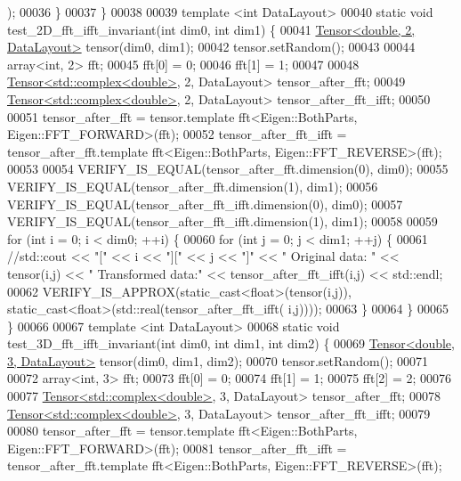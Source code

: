 \begin{DoxyCode}
      );
00036   \}
00037 \}
00038 
00039 \textcolor{keyword}{template} <\textcolor{keywordtype}{int} DataLayout>
00040 \textcolor{keyword}{static} \textcolor{keywordtype}{void} test\_2D\_fft\_ifft\_invariant(\textcolor{keywordtype}{int} dim0, \textcolor{keywordtype}{int} dim1) \{
00041   \hyperlink{class_eigen_1_1_tensor}{Tensor<double, 2, DataLayout>} tensor(dim0, dim1);
00042   tensor.setRandom();
00043 
00044   array<int, 2> fft;
00045   fft[0] = 0;
00046   fft[1] = 1;
00047 
00048   \hyperlink{class_eigen_1_1_tensor}{Tensor<std::complex<double>}, 2, DataLayout> tensor\_after\_fft;
00049   \hyperlink{class_eigen_1_1_tensor}{Tensor<std::complex<double>}, 2, DataLayout> tensor\_after\_fft\_ifft;
00050 
00051   tensor\_after\_fft = tensor.template fft<Eigen::BothParts, Eigen::FFT\_FORWARD>(fft);
00052   tensor\_after\_fft\_ifft = tensor\_after\_fft.template fft<Eigen::BothParts, Eigen::FFT\_REVERSE>(fft);
00053 
00054   VERIFY\_IS\_EQUAL(tensor\_after\_fft.dimension(0), dim0);
00055   VERIFY\_IS\_EQUAL(tensor\_after\_fft.dimension(1), dim1);
00056   VERIFY\_IS\_EQUAL(tensor\_after\_fft\_ifft.dimension(0), dim0);
00057   VERIFY\_IS\_EQUAL(tensor\_after\_fft\_ifft.dimension(1), dim1);
00058 
00059   \textcolor{keywordflow}{for} (\textcolor{keywordtype}{int} i = 0; i < dim0; ++i) \{
00060     \textcolor{keywordflow}{for} (\textcolor{keywordtype}{int} j = 0; j < dim1; ++j) \{
00061       \textcolor{comment}{//std::cout << "[" << i << "][" << j << "]" <<  "  Original data: " << tensor(i,j) << " Transformed
       data:" << tensor\_after\_fft\_ifft(i,j) << std::endl;}
00062       VERIFY\_IS\_APPROX(static\_cast<float>(tensor(i,j)), static\_cast<float>(std::real(tensor\_after\_fft\_ifft(
      i,j))));
00063     \}
00064   \}
00065 \}
00066 
00067 \textcolor{keyword}{template} <\textcolor{keywordtype}{int} DataLayout>
00068 \textcolor{keyword}{static} \textcolor{keywordtype}{void} test\_3D\_fft\_ifft\_invariant(\textcolor{keywordtype}{int} dim0, \textcolor{keywordtype}{int} dim1, \textcolor{keywordtype}{int} dim2) \{
00069   \hyperlink{class_eigen_1_1_tensor}{Tensor<double, 3, DataLayout>} tensor(dim0, dim1, dim2);
00070   tensor.setRandom();
00071 
00072   array<int, 3> fft;
00073   fft[0] = 0;
00074   fft[1] = 1;
00075   fft[2] = 2;
00076 
00077   \hyperlink{class_eigen_1_1_tensor}{Tensor<std::complex<double>}, 3, DataLayout> tensor\_after\_fft;
00078   \hyperlink{class_eigen_1_1_tensor}{Tensor<std::complex<double>}, 3, DataLayout> tensor\_after\_fft\_ifft;
00079 
00080   tensor\_after\_fft = tensor.template fft<Eigen::BothParts, Eigen::FFT\_FORWARD>(fft);
00081   tensor\_after\_fft\_ifft = tensor\_after\_fft.template fft<Eigen::BothParts, Eigen::FFT\_REVERSE>(fft);

\end{DoxyCode}
